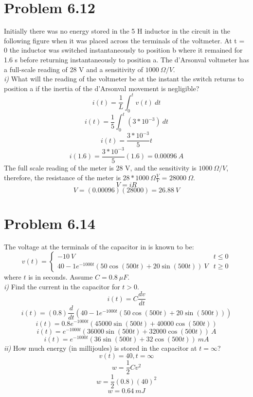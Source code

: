 \documentclass[12pt]{article}
\begin{document}
    \section*{Problem 6.12}
    Initially there was no energy stored in the 5 H inductor in the circuit in
    the following figure when it was placed across the terminals of the voltmeter.
    At t = 0 the inductor was switched instantaneously to position b where it
    remained for 1.6 s before returning instantaneously to position a. The
    d'Arsonval voltmeter has a full-scale reading of 28 V and a sensitivity of
    $1000\ \Omega / V$. \\
    \textit{i)} What will the reading of the voltmeter be at the instant the switch
    returns to position a if the inertia of the d'Arsonval movement is negligible?
    \[
        i(t) = \frac{1}{L} \int_0^t v(t)\ dt
    \]
    \[
        i(t) = \frac{1}{5} \int_0^t (3*10^{-3})\ dt
    \]
    \[
        i(t) = \frac{3*10^{-3}}{5}t
    \]
    \[
        i(1.6) = \frac{3*10^{-3}}{5}(1.6) = 0.00096\ A
    \]
    The full scale reading of the meter is 28 V, and the sensitivity is $1000\
    \Omega / V$, therefore, the resistance of the meter is  $28 * 1000\ \Omega
    \frac{V}{V}$ = $28000\ \Omega$.
    \[
        V = iR
    \]
    \[
        V = (0.00096)(28000) = \boxed{26.88\ V}
    \]
    \section*{Problem 6.14}
    The voltage at the terminals of the capacitor in is known to be:
    \[
        v(t) =
        \begin{cases}
            -10\ V & t \le 0 \\
            40 - 1e^{-1000t}(50\cos(500t) + 20\sin(500t))\ V & t \ge 0
        \end{cases}
    \]
    where $t$ is in seconds. Assume $C = 0.8\ \mu F$. \\
    \textit{i)} Find the current in the capacitor for $t > 0$.
    \[
        i(t) = C \frac{dv}{dt}
    \]
    \[
        i(t) = (0.8) \frac{d}{dt}(40 - 1e^{-1000t}(50\cos(500t) + 20\sin(500t)))
    \]
    \[
        i(t) = 0.8e^{-1000t}(45000\sin(500t) + 40000\cos(500t))
    \]
    \[
        i(t) = e^{-1000t}(36000\sin(500t) + 32000\cos(500t))\ A
    \]
    \[
        \boxed{i(t) = e^{-1000t}(36\sin(500t) + 32\cos(500t))\ mA}
    \]
    \textit{ii)} How much energy (in millijoules) is stored in the capacitor at
    $t=\infty$?
    \[
        v(t) = 40, t = \infty
    \]
    \[
        w = \frac{1}{2} C v^2
    \]
    \[
        w = \frac{1}{2} (0.8) (40)^2
    \]
    \[
        \boxed{w = 0.64\ mJ}
    \]
\end{document}
